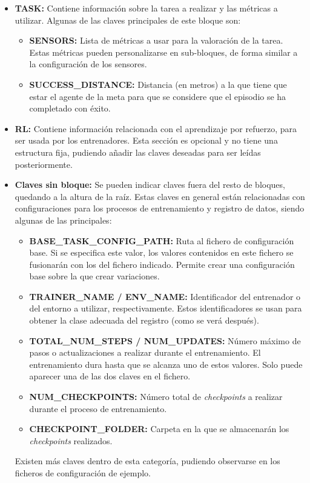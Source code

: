 \begin{itemize}
	\item \textbf{TASK:} Contiene información sobre la tarea a realizar y las métricas a utilizar. Algunas de las claves principales de este bloque son:
	\begin{itemize}
		\item \textbf{SENSORS:} Lista de métricas a usar para la valoración de la tarea. Estas métricas pueden personalizarse en sub-bloques, de forma similar a la configuración de los sensores.
		\item \textbf{SUCCESS{\_}DISTANCE:} Distancia (en metros) a la que tiene que estar el agente de la meta para que se considere que el episodio se ha completado con éxito.
	\end{itemize}
	
	\item \textbf{RL:} Contiene información relacionada con el aprendizaje por refuerzo, para ser usada por los entrenadores. Esta sección es opcional y no tiene una estructura fija, pudiendo añadir las claves deseadas para ser leídas posteriormente.
	
	\item \textbf{Claves sin bloque:} Se pueden indicar claves fuera del resto de bloques, quedando a la altura de la raíz. Estas claves en general están relacionadas con configuraciones para los procesos de entrenamiento y registro de datos, siendo algunas de las principales:
	\begin{itemize}
		\item \textbf{BASE{\_}TASK{\_}CONFIG{\_}PATH:} Ruta al fichero de configuración base. Si se especifica este valor, los valores contenidos en este fichero se fusionarán con los del fichero indicado. Permite crear una configuración base sobre la que crear variaciones.
		\item \textbf{TRAINER{\_}NAME / ENV{\_}NAME:} Identificador del entrenador o del entorno a utilizar, respectivamente. Estos identificadores se usan para obtener la clase adecuada del registro (como se verá después).
		\item \textbf{TOTAL{\_}NUM{\_}STEPS / NUM{\_}UPDATES:} Número máximo de pasos o actualizaciones a realizar durante el entrenamiento. El entrenamiento dura hasta que se alcanza uno de estos valores. Solo puede aparecer una de las dos claves en el fichero.
		\item \textbf{NUM{\_}CHECKPOINTS:} Número total de \textit{checkpoints} a realizar durante el proceso de entrenamiento.
		\item \textbf{CHECKPOINT{\_}FOLDER:} Carpeta en la que se almacenarán los \textit{checkpoints} realizados.
	\end{itemize}
	
	Existen más claves dentro de esta categoría, pudiendo observarse en los ficheros de configuración de ejemplo.
\end{itemize}

